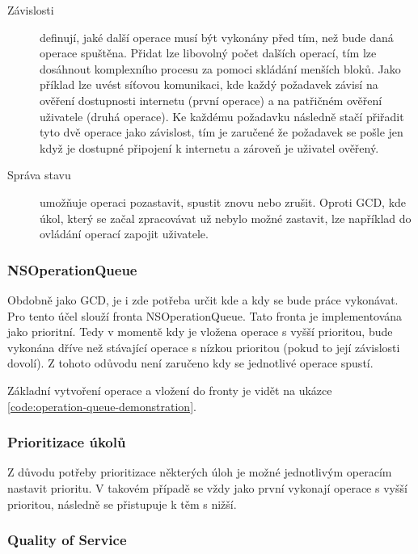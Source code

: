 \begin{description}
  \item[Závislosti] definují, jaké další operace musí být vykonány před tím, než bude daná operace spuštěna.
  Přidat lze libovolný počet dalších operací, tím lze dosáhnout komplexního procesu za pomoci skládání menších bloků.
  Jako příklad lze uvést síťovou komunikaci, kde každý požadavek závisí na ověření dostupnosti internetu (první operace) a na patřičném ověření uživatele (druhá operace).
  Ke každému požadavku následně stačí přiřadit tyto dvě operace jako závislost, tím je zaručené že požadavek se pošle jen když je dostupné připojení k internetu a zároveň je uživatel ověřený.
  \item[Správa stavu] umožňuje operaci pozastavit, spustit znovu nebo zrušit.
  Oproti GCD, kde úkol, který se začal zpracovávat už nebylo možné zastavit, lze například do ovládání operací zapojit uživatele.
\end{description}

\subsubsection*{NSOperationQueue}

Obdobně jako GCD, je i zde potřeba určit kde a kdy se bude práce vykonávat.
Pro tento účel slouží fronta NSOperationQueue.
Tato fronta je implementována jako prioritní.
Tedy v momentě kdy je vložena operace s vyšší prioritou, bude vykonána dříve než stávající operace s nízkou prioritou (pokud to její závislosti dovolí).
Z tohoto odůvodu není zaručeno kdy se jednotlivé operace spustí.

Základní vytvoření operace a vložení do fronty je vidět na ukázce \ref{code:operation-queue-demonstration}.


\subsubsection*{Prioritizace úkolů}

Z důvodu potřeby prioritizace některých úloh je možné jednotlivým operacím nastavit prioritu.
V takovém případě se vždy jako první vykonají operace s vyšší prioritou, následně se přistupuje k těm s nižší.

\subsubsection*{Quality of Service}

